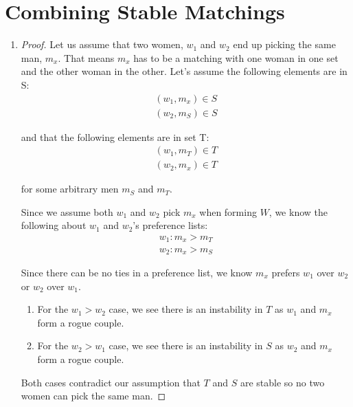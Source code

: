 \documentclass{article}
\begin{document}
\section{Combining Stable Matchings}
\begin{enumerate}[label=(\alph*)]
    \item \begin{proof}
        Let us assume that two women, \(w_1\) and \(w_2\) end up picking the same man, \(m_x\).
        That means \(m_x\) has to be a matching with one woman in one set and the other woman in the other.
        Let's assume the following elements are in S:
        \begin{align*}
            (w_1, m_x) \in S \\ (w_2, m_S) \in S
        \end{align*}

        and that the following elements are in set T:
        \begin{align*}
            (w_1, m_T) \in T \\ (w_2, m_x) \in T
        \end{align*}

         for some arbitrary men \(m_S\) and \(m_T\).

         Since we assume both \(w_1\) and \(w_2\) pick \(m_x\) when forming \(W\), we know the following about \(w_1\) and \(w_2\)'s preference lists:
         \begin{align*}
            w_1: m_x > m_T \\
            w_2: m_x > m_S
         \end{align*}
         
         Since there can be no ties in a preference list, we know \(m_x\) prefers \(w_1\) over \(w_2\) or \(w_2\) over \(w_1\).

        \begin{enumerate}
            \item For the \(w_1 > w_2\) case, we see there is an instability in \(T\) as \(w_1\) and \(m_x\) form a rogue couple.
            \item For the \(w_2 > w_1\) case, we see there is an instability in \(S\) as \(w_2\) and \(m_x\) form a rogue couple.
        \end{enumerate}

        Both cases contradict our assumption that \(T\) and \(S\) are stable so no two women can pick the same man.
    \end{proof}


\end{enumerate}
\end{document}
